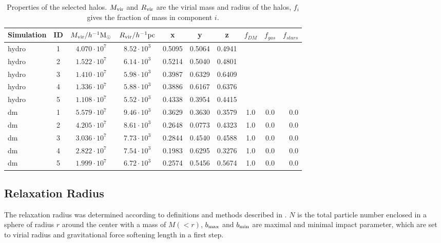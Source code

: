 \documentclass[useAMS,usenatbib]{mn2e}
\begin{document}
\begin{table}
  \begin{center} \begin{tabular}{lccccccccr} \hline Simulation &
      ID & $M_{\rm vir} / h^{-1}{\rm M}_\odot $ & $R_{\rm vir} /
      h^{-1}{\rm pc}$ &x&y&z& $f_{DM}$ & $f_{gas}$ & $f_{stars}$ \\
      \hline
      hydro & 1 & $4.070\cdot10^7$ & $8.52\cdot10^3$&0.5095&0.5064&0.4941&&& \\
      hydro & 2 & $1.522\cdot10^7$ & $6.14\cdot10^3$&0.5214&0.5040&0.4801&&& \\
      hydro & 3 & $1.410\cdot10^7$ & $5.98\cdot10^3$&0.3987&0.6329&0.6409&&& \\
      hydro & 4 & $1.336\cdot10^7$ & $5.88\cdot10^3$&0.3886&0.6167&0.6376&&& \\
      hydro & 5 & $1.108\cdot10^7$ & $5.52\cdot10^3$&0.4338&0.3954&0.4415&&& \\
      \hline
      dm&1&$5.579\cdot10^7$&$9.46\cdot10^3$&0.3629&0.3630&0.3579&1.0&0.0&0.0\\
      dm&2&$4.205\cdot10^7$&$8.61\cdot10^3$&0.2648&0.0773&0.4323&1.0&0.0&0.0\\
      dm&3&$3.036\cdot10^7$&$7.73\cdot10^3$&0.2844&0.4540&0.4588&1.0&0.0&0.0\\
      dm&4&$2.822\cdot10^7$&$7.54\cdot10^3$&0.1983&0.6295&0.3276&1.0&0.0&0.0\\
      dm&5&$1.999\cdot10^7$&$6.72\cdot10^3$&0.2574&0.5456&0.5674&1.0&0.0&0.0\\
      \hline
    \end{tabular} \end{center}
  \caption{\label{tab:haloprop}Properties of the selected halos. $M_{\rm vir}$ and $R_{\rm vir}$ are the virial mass and radius of the halos, $f_i$ gives the fraction of mass in component $i$.}
\end{table}

\subsection{Relaxation Radius}
The relaxation radius was determined according to definitions and
methods described in \cite{Read2009}. $N$ is the total particle number
enclosed in a sphere of radius $r$ around the center with a mass of
$M(<r)$, $b_{\rm max}$ and $b_{\rm min}$ are maximal and minimal
impact parameter, which are set to virial radius and gravitational
force softening length in a first step.
\end{document}
